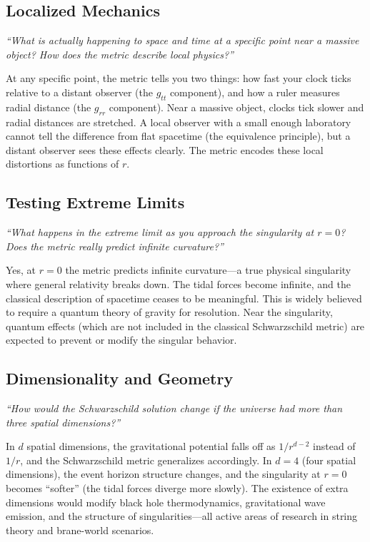 \documentclass[11pt,openright]{book}
\begin{document}
\subsection*{Localized Mechanics}
\textit{``What is actually happening to space and time at a specific point near a massive object? How does the metric describe local physics?''}

At any specific point, the metric tells you two things: how fast your clock ticks relative to a distant observer (the $g_{tt}$ component), and how a ruler measures radial distance (the $g_{rr}$ component). Near a massive object, clocks tick slower and radial distances are stretched. A local observer with a small enough laboratory cannot tell the difference from flat spacetime (the equivalence principle), but a distant observer sees these effects clearly. The metric encodes these local distortions as functions of $r$.

\subsection*{Testing Extreme Limits}
\textit{``What happens in the extreme limit as you approach the singularity at $r = 0$? Does the metric really predict infinite curvature?''}

Yes, at $r = 0$ the metric predicts infinite curvature---a true physical singularity where general relativity breaks down. The tidal forces become infinite, and the classical description of spacetime ceases to be meaningful. This is widely believed to require a quantum theory of gravity for resolution. Near the singularity, quantum effects (which are not included in the classical Schwarzschild metric) are expected to prevent or modify the singular behavior.

\subsection*{Dimensionality and Geometry}
\textit{``How would the Schwarzschild solution change if the universe had more than three spatial dimensions?''}

In $d$ spatial dimensions, the gravitational potential falls off as $1/r^{d-2}$ instead of $1/r$, and the Schwarzschild metric generalizes accordingly. In $d = 4$ (four spatial dimensions), the event horizon structure changes, and the singularity at $r = 0$ becomes ``softer'' (the tidal forces diverge more slowly). The existence of extra dimensions would modify black hole thermodynamics, gravitational wave emission, and the structure of singularities---all active areas of research in string theory and brane-world scenarios.
\end{document}
